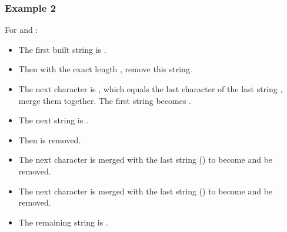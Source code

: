 \documentclass[letterpaper,12pt,english]{book}
\begin{document}
\subsubsection{Example 2}
\label{\detokenize{Stack/1209_Remove_All_Adjacent_Duplicates_in_String_II:id1}}
\sphinxAtStartPar
For  and :
\begin{itemize}
\item {} 
\sphinxAtStartPar
The first built string is .

\item {} 
\sphinxAtStartPar
Then  with the exact length , remove this string.

\item {} 
\sphinxAtStartPar
The next character is , which equals the last character of the last string , merge them together. The first string becomes .

\item {} 
\sphinxAtStartPar
The next string is .

\item {} 
\sphinxAtStartPar
Then  is removed.

\item {} 
\sphinxAtStartPar
The next character  is merged with the last string () to become  and be removed.

\item {} 
\sphinxAtStartPar
The next character  is merged with the last string () to become  and be removed.

\item {} 
\sphinxAtStartPar
The remaining string is .

\end{itemize}
\end{document}
